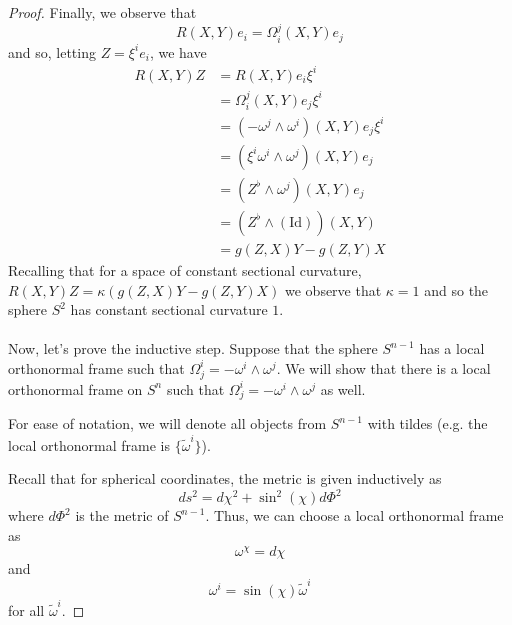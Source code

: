 \documentclass[fontsize=11pt]{scrartcl} %
\numberwithin{equation}{section} %
\numberwithin{figure}{section} %
\numberwithin{table}{section} %
\begin{document}
\begin{proof}
    Finally, we observe that
    \[
        R(X,Y)e_i = \Omega^j_i(X,Y)e_j
    \]
    and so, letting $Z=\xi^ie_i$, we have
    \[
        \begin{aligned}
            R(X,Y)Z &= R(X,Y)e_i\xi^i\\
            &= \Omega^j_i(X,Y)e_j\xi^i\\
            &= (-\omega^j\wedge\omega^i)(X,Y)e_j\xi^i\\
            &= (\xi^i\omega^i\wedge\omega^j)(X,Y)e_j\\
            &= (Z^{\flat}\wedge\omega^j)(X,Y)e_j\\
            &= (Z^{\flat}\wedge(\text{Id}))(X,Y)\\
            &= g(Z,X)Y - g(Z,Y)X
        \end{aligned}
    \]
    Recalling that for a space of constant sectional curvature, $R(X,Y)Z =
    \kappa(g(Z,X)Y - g(Z,Y)X)$ we observe that $\kappa = 1$ and so the sphere
    $S^2$ has constant sectional curvature $1$.
    \\
    \\
    Now, let's prove the inductive step. Suppose that the sphere $S^{n-1}$ has
    a local orthonormal frame such that $\Omega^i_j = -\omega^i\wedge\omega^j$. 
    We will show that there is a local orthonormal frame on $S^n$ such that
    $\Omega^i_j = -\omega^i\wedge\omega^j$ as well.

    For ease of notation, we will denote all objects from $S^{n-1}$ with tildes
    (e.g. the local orthonormal frame is $\{\tilde{\omega}^i\}$).

    Recall that for spherical coordinates, the metric is given inductively as
    \[
        ds^2 = d\chi^2 + \sin^2(\chi)d\Phi^2
    \]
    where $d\Phi^2$ is the metric of $S^{n-1}$. Thus, we can choose a local
    orthonormal frame as
    \[
    \omega^{\chi} = d\chi
    \]
    and
    \[
        \omega^i = \sin(\chi)\tilde{\omega}^i
    \]
    for all $\tilde{\omega}^i$.


\end{proof}
\end{document}
